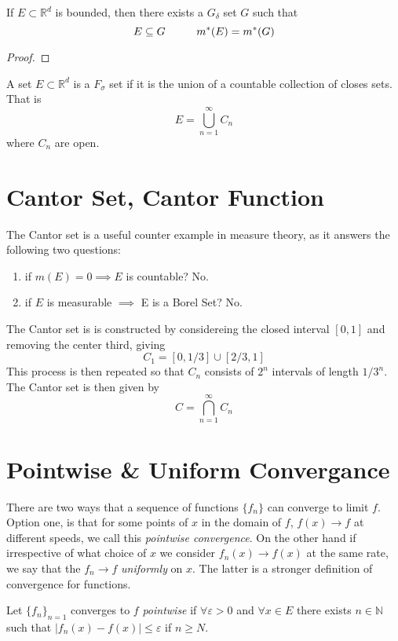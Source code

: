 \begin{lemma}
    If  $E\subset\mathbb{R}^d$ is bounded, then there exists a $G_\delta$ set $G$ such that
    $$E\subseteq G \hspace{10mm} m^*(E) = m^*(G)$$
\end{lemma}
\begin{proof}
    
\end{proof}


\begin{definition} A set $E\subset\mathbb{R}^d$ is a $F_\sigma$ set if it is the union of a countable collection of closes sets. That is 
$$E = \bigcup_{n=1}^{\infty}C_n$$
where $C_n$ are open. 
\end{definition}


\newpage
\section{Cantor Set, Cantor Function}
The Cantor set is a useful counter example in measure theory, as it answers the following two questions: \begin{enumerate}
    \item if $m(E) = 0 \implies E$ is countable? No. 
    \item if $E$ is measurable $\implies$ E is a Borel Set? No.
\end{enumerate}
The Cantor set is is constructed by considereing the closed interval $[0,1]$ and removing the center third, giving 
$$C_1 = [0, 1/3] \cup [2/3, 1]$$
This process is then repeated so that $C_n$ consists of $2^n$ intervals of length $1/3^n$. The Cantor set is then given by 
$$C = \bigcap_{n=1}^{\infty} C_n$$

\newpage
\section{Pointwise \& Uniform Convergance}

There are two ways that a sequence of functions $\{f_n\}$ can converge to limit $f$. Option one, is that for some points of $x$ in the domain of $f$, $f(x)\rightarrow f$ at different speeds, we call this \textit{pointwise convergence}. On the other hand if irrespective of what choice of $x$ we consider $f_n(x)\rightarrow f(x)$ at the same rate, we say that the $f_n\rightarrow f$ \textit{uniformly} on $x$. The latter is a stronger definition of convergence for functions.  

\begin{definition}
 Let $\{f_n\}_{n=1}$ converges to $f$ \textit{pointwise} if $\forall\varepsilon>0$ and $\forall x\in E$ there exists $n\in\mathbb{N}$ such that $|f_{n}(x) - f(x)|\leq\varepsilon$ if $n\geq N$. 
\end{definition}

